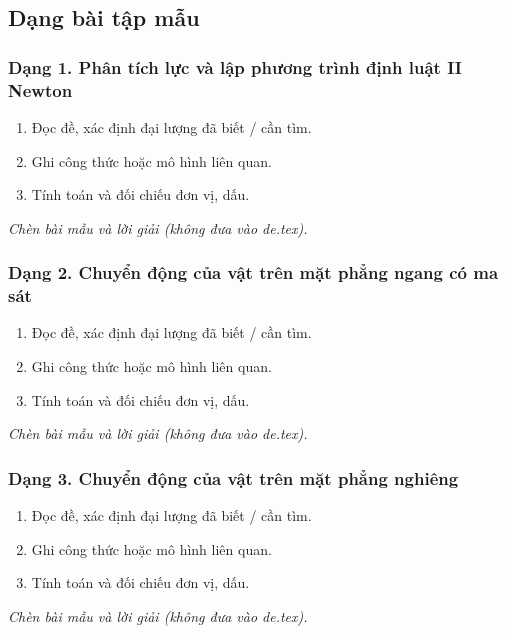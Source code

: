 

\subsection{Dạng bài tập mẫu}
\subsubsection{Dạng 1. Phân tích lực và lập phương trình định luật II Newton}
\begin{phuongphap}
\begin{enumerate}
\item Đọc đề, xác định đại lượng đã biết / cần tìm.
\item Ghi công thức hoặc mô hình liên quan.
\item Tính toán và đối chiếu đơn vị, dấu.
\end{enumerate}
\end{phuongphap}
\begin{vidumau}
\textit{Chèn bài mẫu và lời giải (không đưa vào de.tex).}
\end{vidumau}

\subsubsection{Dạng 2. Chuyển động của vật trên mặt phẳng ngang có ma sát}
\begin{phuongphap}
\begin{enumerate}
\item Đọc đề, xác định đại lượng đã biết / cần tìm.
\item Ghi công thức hoặc mô hình liên quan.
\item Tính toán và đối chiếu đơn vị, dấu.
\end{enumerate}
\end{phuongphap}
\begin{vidumau}
\textit{Chèn bài mẫu và lời giải (không đưa vào de.tex).}
\end{vidumau}

\subsubsection{Dạng 3. Chuyển động của vật trên mặt phẳng nghiêng}
\begin{phuongphap}
\begin{enumerate}
\item Đọc đề, xác định đại lượng đã biết / cần tìm.
\item Ghi công thức hoặc mô hình liên quan.
\item Tính toán và đối chiếu đơn vị, dấu.
\end{enumerate}
\end{phuongphap}
\begin{vidumau}
\textit{Chèn bài mẫu và lời giải (không đưa vào de.tex).}
\end{vidumau}

